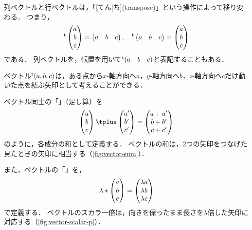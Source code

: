 \documentclass[../sotsu.tex]{subfiles}
\begin{document}
列ベクトルと行ベクトルは，「[てん|ち](transpose)」という操作によって移り変わる．
つまり，
\begin{equation*}
    {}^{\mathrm{t}}\begin{pmatrix}
        a  \\  b  \\  c
    \end{pmatrix}
    =
    \begin{pmatrix}
        a  &  b  &  c
    \end{pmatrix},
    \quad
    {}^{\mathrm{t}}\begin{pmatrix}
        a  &  b  &  c
    \end{pmatrix}
    =
    \begin{pmatrix}
        a  \\  b  \\  c
    \end{pmatrix}
\end{equation*}
である．
列ベクトルを，転置を用いて${}^{\mathrm{t}}(a \quad b \quad c)$と表記することもある．

ベクトル${}^{\mathrm{t}}(a, b, c)$は，ある点から$x$-軸方向へ$a$，$y$-軸方向へ$b$，$z$-軸方向へ$c$だけ動いた点を結ぶ矢印として考えることができる．

ベクトル同士の「」（足し算）を
\begin{equation*}
    \begin{pmatrix}
        a  \\  b  \\  c
    \end{pmatrix}
    \vecplus
    \begin{pmatrix}
        a' \\ b' \\ c'
    \end{pmatrix}
    =
    \begin{pmatrix}
        a + a'  \\  b + b'  \\  c + c'
    \end{pmatrix}
\end{equation*}
のように，各成分の和として定義する．
ベクトルの和は，2つの矢印をつなげた見たときの矢印に相当する（\cref{fig:vector-sum}）．

また，ベクトルの「」を，
\begin{equation*}
    \lambda \mathbin{\star} 
    \begin{pmatrix}
        a  \\  b  \\  c
    \end{pmatrix}
    =
    \begin{pmatrix}
        \lambda a  \\  \lambda b  \\  \lambda c
    \end{pmatrix}
\end{equation*}
で定義する．
ベクトルのスカラー倍は，向きを保ったまま長さを$\lambda$倍した矢印に対応する（\cref{fig:vector-scalar-p}）．
\end{document}
